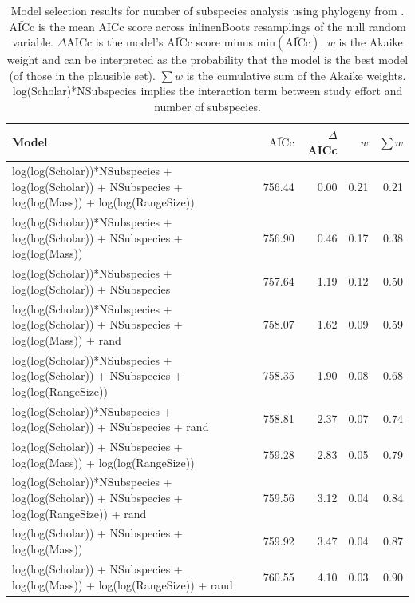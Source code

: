 \begin{table}[ht]
\centering
\caption[
  Full model selection results for number of subspecies analysis using alternative phylogeny. 
]{
  Model selection results for number of subspecies analysis using phylogeny from \cite{jones2005bats}. 
  $\bar{\text{AICc}}$ is the mean AICc score across 
inline{nBoots} resamplings of the null random variable. 
  $\Delta$AICc is the model's $\bar{\text{AICc}}$ score minus $\text{min}(\bar{\text{AICc}})$. 
  $w$ is the Akaike weight and can be interpreted as the probability that the model is the best model (of those in the plausible set).
  $\sum w$ is the cumulative sum of the Akaike weights.
  log(Scholar)*NSubspecies implies the interaction term between study effort and number of subspecies.
  } 
\label{A-modelWeights2}
\begingroup\tiny
\begin{tabular}{@{}lrrrr@{}}
  \toprule
Model & $\bar{\text{AICc}}$ & $\Delta$AICc & $w$ & $\sum w$ \\ 
  \midrule
log(log(Scholar))*NSubspecies + log(log(Scholar)) + NSubspecies + log(log(Mass)) + log(log(RangeSize)) & 756.44 & 0.00 & 0.21 & 0.21 \\ 
  log(log(Scholar))*NSubspecies + log(log(Scholar)) + NSubspecies + log(log(Mass)) & 756.90 & 0.46 & 0.17 & 0.38 \\ 
  log(log(Scholar))*NSubspecies + log(log(Scholar)) + NSubspecies & 757.64 & 1.19 & 0.12 & 0.50 \\ 
  log(log(Scholar))*NSubspecies + log(log(Scholar)) + NSubspecies + log(log(Mass)) + rand & 758.07 & 1.62 & 0.09 & 0.59 \\ 
  log(log(Scholar))*NSubspecies + log(log(Scholar)) + NSubspecies + log(log(RangeSize)) & 758.35 & 1.90 & 0.08 & 0.68 \\ 
  log(log(Scholar))*NSubspecies + log(log(Scholar)) + NSubspecies + rand & 758.81 & 2.37 & 0.07 & 0.74 \\ 
  log(log(Scholar)) + NSubspecies + log(log(Mass)) + log(log(RangeSize)) & 759.28 & 2.83 & 0.05 & 0.79 \\ 
  log(log(Scholar))*NSubspecies + log(log(Scholar)) + NSubspecies + log(log(RangeSize)) + rand & 759.56 & 3.12 & 0.04 & 0.84 \\ 
  log(log(Scholar)) + NSubspecies + log(log(Mass)) & 759.92 & 3.47 & 0.04 & 0.87 \\ 
  log(log(Scholar)) + NSubspecies + log(log(Mass)) + log(log(RangeSize)) + rand & 760.55 & 4.10 & 0.03 & 0.90 \\ 

\end{tabular}
\end{table}
